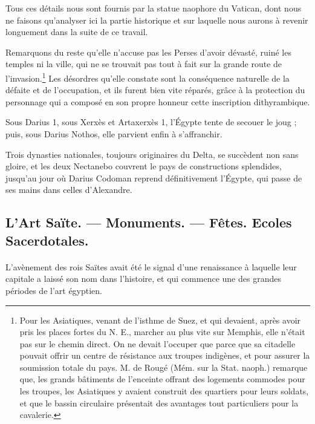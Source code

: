 \documentclass[a4paper, 11pt, oneside]{article}
\begin{document}
Tous ces détails nous sont fournis par la statue naophore du Vatican, dont nous ne faisons qu'analyser ici la partie historique et sur laquelle nous aurons à revenir longuement dans la suite de ce travail.

Remarquons du reste qu'elle n'accuse pas les Perses d'avoir dévasté, ruiné les temples ni la ville, qui ne se trouvait pas tout à fait sur la grande route de l'invasion.\footnote{Pour les Asiatiques, venant de l'isthme de Suez, et qui devaient, après avoir pris les places fortes du N. E., marcher au plus vite sur Memphis, elle n'était pas sur le chemin direct. On ne devait l'occuper que parce que sa citadelle pouvait offrir un centre de résistance aux troupes indigènes, et pour assurer la soumission totale du pays. M. de Rougé (Mém. sur la Stat. naoph.) remarque que, les grands bâtiments de l'enceinte offrant des logements commodes pour les troupes, les Asiatiques y avaient construit des quartiers pour leurs soldats, et que le bassin circulaire présentait des avantages tout particuliers pour la cavalerie.} Les désordres qu'elle constate sont la conséquence naturelle de la défaite et de l'occupation, et ils furent bien vite réparés, grâce à la protection du personnage qui a composé en son propre honneur cette inscription dithyrambique.

Sous Darius 1, sous Xerxès et Artaxerxès 1, l'Égypte tente de secouer le joug ; puis, sous Darius Nothos, elle parvient enfin à s'affranchir.

Trois dynasties nationales, toujours originaires du Delta, se succèdent non sans gloire, et les deux Nectanebo couvrent le pays de constructions splendides, jusqu'au jour où Darius Codoman reprend définitivement l'Égypte, qui passe de ses mains dans celles d'Alexandre.
\clearpage
\subsection{L'Art Saïte. --- Monuments. --- Fêtes. Ecoles Sacerdotales.}
\paragraph{}
L'avènement des rois Saïtes avait été le signal d'une renaissance à laquelle leur capitale a laissé son nom dans l'histoire, et qui commence une des grandes périodes de l'art égyptien.
\end{document}
